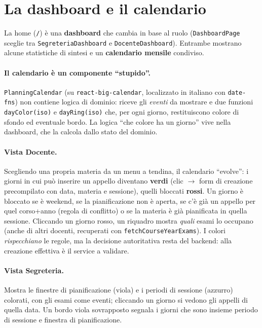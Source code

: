 \documentclass[11pt,a4paper,oneside]{report}
\newcommand{\code}[1]{\texttt{\small #1}}
\begin{document}
\section{La dashboard e il calendario}
La home (\code{/}) è una \textbf{dashboard} che cambia in base al ruolo
(\code{DashboardPage} sceglie tra \code{SegreteriaDashboard} e
\code{DocenteDashboard}). Entrambe mostrano alcune statistiche di sintesi e un
\textbf{calendario mensile} condiviso.

\paragraph{Il calendario è un componente ``stupido''.}
\code{PlanningCalendar} (su \code{react-big-calendar}, localizzato in italiano con
\code{date-fns}) non contiene logica di dominio: riceve gli \emph{eventi} da
mostrare e due funzioni \code{dayColor(iso)} e \code{dayRing(iso)} che, per ogni
giorno, restituiscono colore di sfondo ed eventuale bordo. La logica ``che colore
ha un giorno'' vive nella dashboard, che la calcola dallo stato del dominio.

\paragraph{Vista Docente.} Scegliendo una propria materia da un menu a tendina, il
calendario ``evolve'': i giorni in cui può inserire un appello diventano
\textbf{verdi} (clic $\rightarrow$ form di creazione precompilato con data,
materia e sessione), quelli bloccati \textbf{rossi}. Un giorno è bloccato se è
weekend, se la pianificazione non è aperta, se c'è già un appello per quel
corso+anno (regola di conflitto) o se la materia è già pianificata in quella
sessione. Cliccando un giorno rosso, un riquadro mostra \emph{quali} esami lo
occupano (anche di altri docenti, recuperati con \code{fetchCourseYearExams}). I
colori \emph{rispecchiano} le regole, ma la decisione autoritativa resta del
backend: alla creazione effettiva è il service a validare.

\paragraph{Vista Segreteria.} Mostra le finestre di pianificazione (viola) e i
periodi di sessione (azzurro) colorati, con gli esami come eventi; cliccando un
giorno si vedono gli appelli di quella data. Un bordo viola sovrapposto segnala i
giorni che sono insieme periodo di sessione e finestra di pianificazione.
\end{document}
